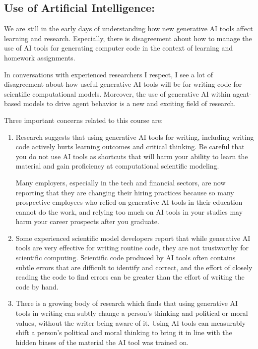 \documentclass[11pt,twoside]{jgsyllabus}\usepackage[]{graphicx}\usepackage[]{xcolor}
\begin{document}
\subsection{Use of Artificial Intelligence:}

We are still in the early days of understanding how new generative AI
tools affect learning and research. Especially, there is disagreement
about how to manage the use of AI tools for generating computer code
in the context of learning and homework assignments.

In conversations with experienced researchers I respect, I see a lot of
disagreement about how useful generative AI tools will be for writing
code for scientific computational models. Moreover, the use of
generative AI within agent-based models to drive agent behavior is a
new and exciting field of research.

Three important concerns related to this course are:

\begin{enumerate}
\item Research suggests that using generative AI tools for writing,
  including writing code actively hurts learning outcomes and critical
  thinking. Be careful that you do not use AI tools as shortcuts that
  will harm your ability to learn the material and gain proficiency
  at computational scientific modeling.

  Many employers, especially in the tech and financial sectors, are
  now reporting that they are changing their hiring practices because so
  many prospective employees who relied on generative AI tools in their
  education cannot do the work, and relying too much on AI tools in your
  studies may harm your career prospects after you graduate.
\item Some experienced scientific model developers report that while
  generative AI tools are very effective for writing routine code,
  they are not trustworthy for scientific computing. Scientific code
  produced by AI tools often contains subtle errors that are difficult
  to identify and correct, and the effort of closely reading the code to
  find errors can be greater than the effort of writing the code by
  hand.
\item There is a growing body of research which finds that using
  generative AI tools in writing can subtly change a person's thinking
  and political or moral values, without the writer being aware of it.
  Using AI tools can measurably shift a person's political and moral
  thinking to bring it in line with the hidden biases of the material
  the AI tool was trained on.
\end{enumerate}
\end{document}
